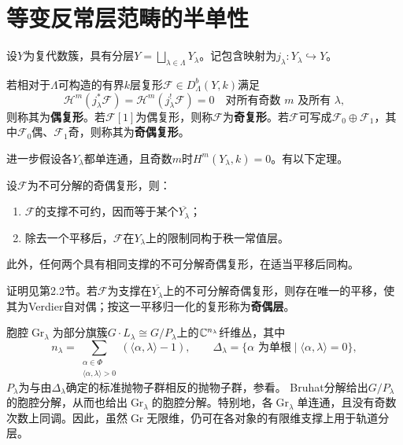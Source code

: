 \section{等变反常层范畴的半单性}\label{L23S2}
设$Y$为复代数簇，具有分层$Y=\bigsqcup_{\lambda\in\Lambda}Y_\lambda$。记包含映射为$j_\lambda:Y_\lambda\hookrightarrow Y$。
\begin{definition*}
若相对于$\Lambda$可构造的有界$k$层复形$\mathcal F\in D^b_\Lambda(Y,k)$满足
\begin{equation}\tag{2.1}\label{L23eq21}\mathcal H^m(j_\lambda^*\mathcal F)=\mathcal H^m(j_\lambda^!\mathcal F)=0\quad\text{对所有奇数 }m\text{ 及所有 }\lambda,\end{equation}
则称其为\textbf{偶复形}。若$\mathcal F[1]$为偶复形，则称$\mathcal F$为\textbf{奇复形}。若$\mathcal F$可写成$\mathcal F_0\oplus\mathcal F_1$，其中$\mathcal F_0$偶、$\mathcal F_1$奇，则称其为\textbf{奇偶复形}。
\end{definition*}
进一步假设各$Y_\lambda$都单连通，且奇数$m$时$H^m(Y_\lambda,k)=0$。有以下定理。
\begin{theorem}\label{L23S2O1}
设$\mathcal F$为不可分解的奇偶复形，则：
\begin{enumerate}[label=\arabic*.]
\item $\mathcal F$的支撑不可约，因而等于某个$\overline{Y_\lambda}$；
\item 除去一个平移后，$\mathcal F$在$Y_\lambda$上的限制同构于秩一常值层。
\end{enumerate}
此外，任何两个具有相同支撑的不可分解奇偶复形，在适当平移后同构。
\end{theorem}
证明见第2.2节。若$\mathcal F$为支撑在$\overline{Y_\lambda}$上的不可分解奇偶复形，则存在唯一的平移，使其为Verdier自对偶；按这一平移归一化的复形称为\textbf{奇偶层}。

胞腔$\operatorname{Gr}_\lambda$为部分旗簇$G\cdot L_\lambda\cong G/P_\lambda$上的$\mathbb{C}^{n_\lambda}$纤维丛，其中
\[n_\lambda=\sum_{\substack{\alpha\in\Phi\\\langle\alpha,\lambda\rangle>0}}(\langle\alpha,\lambda\rangle-1),\qquad\Delta_\lambda=\{\alpha\text{ 为单根}\mid\langle\alpha,\lambda\rangle=0\},\]
$P_\lambda$为与由$\Delta_\lambda$确定的标准抛物子群相反的抛物子群，参看。
Bruhat分解给出$G/P_\lambda$的胞腔分解，从而也给出$\operatorname{Gr}_\lambda$的胞腔分解。特别地，各$\operatorname{Gr}_\lambda$单连通，且没有奇数次数上同调。因此，虽然$\operatorname{Gr}$无限维，仍可在各对象的有限维支撑上用于轨道分层。

